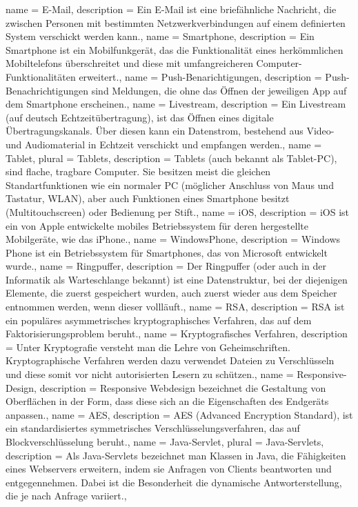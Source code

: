 {
  name = E-Mail,
  description = {Ein E-Mail ist eine briefähnliche Nachricht, die zwischen Personen mit bestimmten Netzwerkverbindungen auf einem definierten System verschickt werden kann.},
}
{
  name = Smartphone,
  description = {Ein Smartphone ist ein Mobilfunkgerät, das die Funktionalität eines herkömmlichen Mobiltelefons überschreitet und diese mit umfangreicheren Computer-Funktionalitäten erweitert.},
}
{
  name = Push-Benarichtigungen,
  description = {Push-Benachrichtigungen sind Meldungen, die ohne das Öffnen der jeweiligen \gls{App} auf dem \gls{Smartphone} erscheinen.},
}
{
  name = Livestream,
  description = {Ein Livestream (auf deutsch Echtzeitübertragung), ist das Öffnen eines digitale Übertragungskanals. Über diesen kann ein Datenstrom, bestehend aus Video- und Audiomaterial in Echtzeit verschickt und empfangen werden.},
}
{
  name = Tablet,
  plural = Tablets,
  description = {Tablets (auch bekannt als Tablet-PC), sind flache, tragbare Computer. Sie besitzen meist die gleichen Standartfunktionen wie ein normaler PC (möglicher Anschluss von Maus und Tastatur, WLAN), aber auch Funktionen eines \gls{Smartphone} besitzt (Multitouchscreen) oder Bedienung per Stift.},
}
{
  name = iOS,
  description = {iOS ist ein von Apple entwickelte mobiles Betriebssystem für deren hergestellte Mobilgeräte, wie das iPhone.},
}
{
  name = WindowsPhone,
  description = {Windows Phone ist ein Betriebssystem für Smartphones, das von Microsoft entwickelt wurde.},
}
{
  name = Ringpuffer,
  description = {Der Ringpuffer (oder auch in der Informatik als Warteschlange bekannt) ist eine Datenstruktur, bei der diejenigen Elemente, die zuerst gespeichert wurden, auch zuerst wieder aus dem Speicher entnommen werden, wenn dieser vollläuft.},
}
{
  name = RSA,
  description = {RSA ist ein populäres asymmetrisches kryptographisches Verfahren, das auf dem Faktorisierungsproblem beruht.},
}
{
  name = Kryptografisches Verfahren,
  description = {Unter Kryptografie versteht man die Lehre von Geheimschriften. Kryptographische Verfahren werden dazu verwendet Dateien zu Verschlüsseln und diese somit vor nicht autorisierten Lesern zu schützen.},
}
{
  name = Responsive-Design,
  description = {Responsive Webdesign bezeichnet die Gestaltung von Oberflächen in der Form, dass diese sich an die Eigenschaften des Endgeräts anpassen.},
}
{
  name = AES,
  description = {AES (Advanced Encryption Standard), ist ein standardisiertes symmetrisches Verschlüsselungsverfahren, das auf Blockverschlüsselung beruht.},
}
{
  name = Java-Servlet,
  plural = Java-Servlets,
  description = {Als Java-Servlets bezeichnet man Klassen in Java, die Fähigkeiten eines Webservers erweitern, indem sie Anfragen von Clients beantworten und entgegennehmen. Dabei ist die Besonderheit die dynamische Antworterstellung, die je nach Anfrage variiert.},
}

